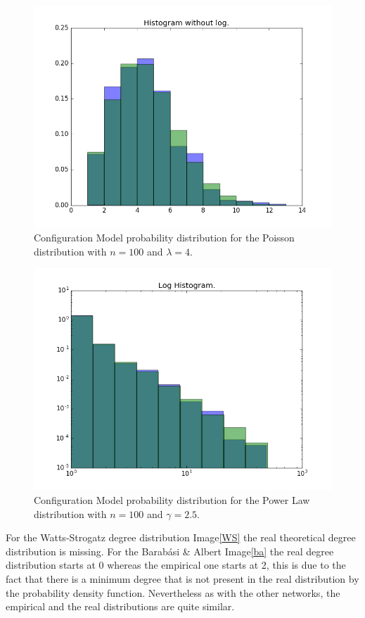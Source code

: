 \documentclass[12pt,a4paper,oneside]{article}
\numberwithin{equation}{section}
\numberwithin{equation}{section}
\theoremstyle{definition}
\begin{document}
\begin{figure}[h!]
	\centering
	\includegraphics[scale=1]{plots/CMPoisson.png}
	\caption{Configuration Model probability distribution for the Poisson distribution with $n=100$ and $\lambda=4$.}
\end{figure}

\begin{figure}[h!]
	\centering
	\includegraphics[scale=1]{plots/CMPowerLaw.png}
	\caption{Configuration Model probability distribution for the Power Law distribution with $n=100$ and $\gamma=2.5$.}
\end{figure}

For the Watts-Strogatz degree distribution Image\ref{WS} the real theoretical degree distribution is missing. For the Barabási \& Albert Image\ref{ba} the real degree distribution starts at 0 whereas the empirical one starts at 2, this is due to the fact that there is a minimum degree that is not present in the real distribution by the probability density function. Nevertheless as with the other networks, the empirical and the real distributions are quite similar.
\end{document}
